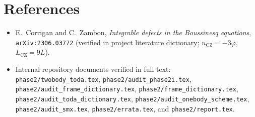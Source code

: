 \documentclass[11pt,a4paper]{article}
\begin{document}
\section*{References}
\begin{itemize}[leftmargin=2em]
  \item E.~Corrigan and C.~Zambon, \emph{Integrable defects in the Boussinesq equations}, \texttt{arXiv:2306.03772} (verified in project literature dictionary; $u_{\mathrm{CZ}}=-3\varphi$, $L_{\mathrm{CZ}}=9L$).
  \item Internal repository documents verified in full text: \texttt{phase2/twobody\_toda.tex}, \texttt{phase2/audit\_phase2i.tex}, \texttt{phase2/audit\_frame\_dictionary.tex}, \texttt{phase2/frame\_dictionary.tex}, \texttt{phase2/audit\_toda\_dictionary.tex}, \texttt{phase2/audit\_onebody\_scheme.tex}, \texttt{phase2/audit\_smx.tex}, \texttt{phase2/errata.tex}, and \texttt{phase2/report.tex}.
\end{itemize}
\end{document}
